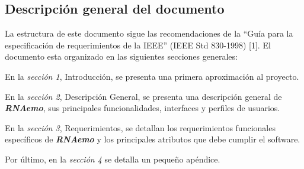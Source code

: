 \documentclass[10pt,a4paper,english,spanish]{article}
\newcommand{\rnaemo}{\textbf{\emph{RNAemo}}}
\begin{document}



\subsection{Descripción general del documento}
\par La estructura de este documento sigue las recomendaciones de la ``Guía para
la especificación de requerimientos de la IEEE'' (IEEE Std 830-1998) [1].
El documento esta organizado en las siguientes secciones generales: 
\par En la \textit{sección 1}, Introducción, se presenta una primera aproximación al proyecto. 
\par En la \textit{sección 2}, Descripción General, se presenta una descripción general de \rnaemo, sus principales
funcionalidades, interfaces y perfiles de usuarios. 
\par En la \textit{sección 3}, Requerimientos, se detallan los requerimientos funcionales específicos de \textbf{\emph{RNAemo}} y
 los principales atributos que debe cumplir el software.
\par Por último, en la \textit{sección 4} se detalla un pequeño apéndice.
\end{document}
